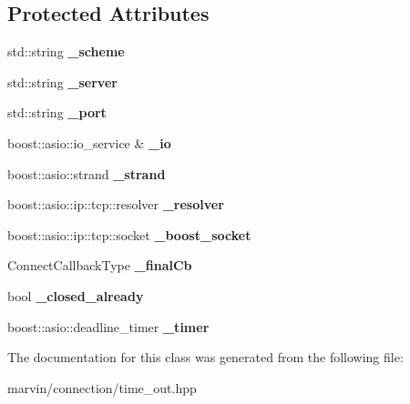 \subsection*{Protected Attributes}
\begin{DoxyCompactItemize}
\item 
\mbox{\label{class_time_out_a98d77ddb4baccce6f97b551728d878d0}} 
std\+::string {\bfseries \+\_\+scheme}
\item 
\mbox{\label{class_time_out_a52ba43e052d79097be967cde9d08e470}} 
std\+::string {\bfseries \+\_\+server}
\item 
\mbox{\label{class_time_out_ac2a42f7a616be4d6ac97bf545673e5e8}} 
std\+::string {\bfseries \+\_\+port}
\item 
\mbox{\label{class_time_out_a61a4a59319e24729c914c0e5f3ede3af}} 
boost\+::asio\+::io\+\_\+service \& {\bfseries \+\_\+io}
\item 
\mbox{\label{class_time_out_a68303d584480d7e6fd6a401d259aa46c}} 
boost\+::asio\+::strand {\bfseries \+\_\+strand}
\item 
\mbox{\label{class_time_out_acb19631d495983094e5b5b02dae18e85}} 
boost\+::asio\+::ip\+::tcp\+::resolver {\bfseries \+\_\+resolver}
\item 
\mbox{\label{class_time_out_a94da88a3e2bf5c7d3b8bdb45a8e4760f}} 
boost\+::asio\+::ip\+::tcp\+::socket {\bfseries \+\_\+boost\+\_\+socket}
\item 
\mbox{\label{class_time_out_a3f3b6d27b8ec15bd22b42f17361957ce}} 
Connect\+Callback\+Type {\bfseries \+\_\+final\+Cb}
\item 
\mbox{\label{class_time_out_af46e605603cc4db3fd93484248b0c924}} 
bool {\bfseries \+\_\+closed\+\_\+already}
\item 
\mbox{\label{class_time_out_a7254c5e68178b6acc2a2a7bc705e68d7}} 
boost\+::asio\+::deadline\+\_\+timer {\bfseries \+\_\+timer}
\end{DoxyCompactItemize}


The documentation for this class was generated from the following file\+:\begin{DoxyCompactItemize}
\item 
marvin/connection/time\+\_\+out.\+hpp\end{DoxyCompactItemize}

